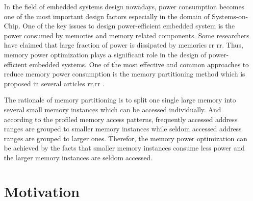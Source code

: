 \label{chap:introduction}
In the field of embedded systems design nowadays, power consumption
becomes one of the most important design factors especially in the domain
of Systems-on-Chip. One of the key issues to design power-efficient embedded
system is the power consumed by memories and memory related components.
Some researchers have claimed that large fraction of power is dissipated by
memories rr rr. Thus, memory power optimization plays a significant role
in the design of power-efficient embedded systems. One of the most effective
and common approaches to reduce memory power consumption is the memory 
partitioning method which is proposed in several articles rr,rr \cite{Strobel2016}.

The rationale of memory partitioning is to split one single large memory into 
several small memory instances which can be accessed individually. And according 
to the profiled memory access patterns, frequently accessed address ranges are 
grouped to smaller memory instances while seldom accessed address ranges are grouped 
to larger ones. Therefor, the memory power optimization can be achieved by the facts 
that smaller memory instances consume less power and the larger memory instances are 
seldom accessed.

\section{Motivation}
\label{sec:motivation}

